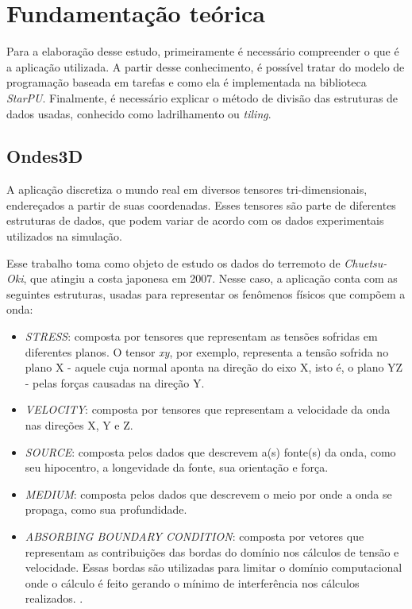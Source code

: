 \documentclass[cic,tc]{iiufrgs}
\begin{document}
\chapter{Fundamentação teórica}
Para a elaboração desse estudo, primeiramente é necessário compreender o que é a aplicação utilizada. A partir desse conhecimento, é possível tratar do modelo de programação
baseada em tarefas e como ela é implementada na biblioteca \textit{StarPU}. Finalmente, é necessário explicar o método de divisão das estruturas de dados usadas, conhecido como
ladrilhamento ou \textit{tiling}.

\section{Ondes3D}
A aplicação discretiza o mundo real em diversos tensores tri-dimensionais, endereçados a partir de suas coordenadas. Esses tensores são parte de diferentes estruturas de dados,
que podem variar de acordo com os dados experimentais utilizados na simulação.

Esse trabalho toma como objeto de estudo os dados do terremoto de \textit{Chuetsu-Oki},
que atingiu a costa japonesa em 2007. Nesse caso, a aplicação conta com as seguintes estruturas, usadas para representar os fenômenos físicos que compõem a onda:

\begin{itemize}
\item{\textit{STRESS}:} composta por tensores que representam as tensões sofridas em diferentes planos. O tensor \textit{xy}, por exemplo, representa a tensão sofrida no plano
  X - aquele cuja normal aponta na direção do eixo X, isto é, o plano YZ - pelas forças causadas na direção Y.
\item{\textit{VELOCITY}:} composta por tensores que representam a velocidade da onda nas direções X, Y e Z.
\item{\textit{SOURCE}:} composta pelos dados que descrevem a(s) fonte(s) da onda, como seu hipocentro, a longevidade da fonte, sua orientação e força.
\item{\textit{MEDIUM}:} composta pelos dados que descrevem o meio por onde a onda se propaga, como sua profundidade.
\item{\textit{ABSORBING BOUNDARY CONDITION}:} composta por vetores que representam as contribuições das bordas do domínio nos cálculos de tensão e velocidade. Essas bordas são
  utilizadas para limitar o domínio computacional onde o cálculo é feito gerando o mínimo de interferência nos cálculos realizados. \cite{ABCarticle}. 
\end{itemize}
\end{document}
